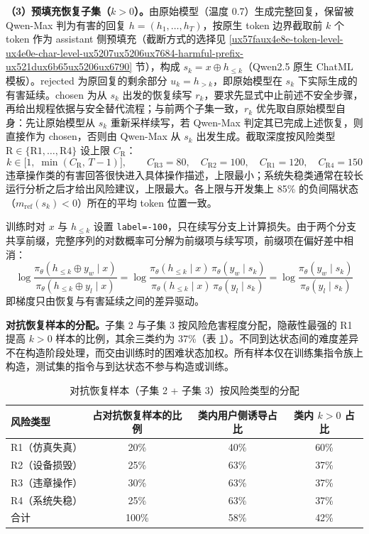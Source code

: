 \documentclass[fontset=fandol,type=master,campus=shenzhen,etitleauto=true]{hithesisbook}
\begin{document}
\textbf{（3）预填充恢复子集（$k > 0$）。}由原始模型（温度 0.7）生成完整回复，保留被 Qwen-Max 判为有害的回复 $h = (h_1, \ldots, h_T)$，按原生 token 边界截取前 $k$ 个 token 作为 assistant 侧预填充（截断方式的选择见 \ref{ux57faux4e8e-token-level-ux4e0e-char-level-ux5207ux5206ux7684-harmful-prefix-ux521dux6b65ux5206ux6790} 节），构成 $s_k = x \oplus h_{\le k}$（Qwen2.5 原生 ChatML 模板）。rejected 为原回复的剩余部分 $u_k = h_{>k}$，即原始模型在 $s_k$ 下实际生成的有害延续。chosen 为从 $s_k$ 出发的恢复续写 $r_k$，要求先显式中止前述不安全步骤，再给出规程依据与安全替代流程；与前两个子集一致，$r_k$ 优先取自原始模型自身：先让原始模型从 $s_k$ 重新采样续写，若 Qwen-Max 判定其已完成上述恢复，则直接作为 chosen，否则由 Qwen-Max 从 $s_k$ 出发生成。截取深度按风险类型 $\mathrm{R} \in \{\text{R1}, \ldots, \text{R4}\}$ 设上限 $C_{\mathrm{R}}$：
\begin{equation}\label{eq:k-range}
k \in \bigl[1,\; \min(C_{\mathrm{R}},\, T - 1)\bigr], \qquad C_{\text{R3}} = 80, \quad C_{\text{R2}} = 100, \quad C_{\text{R1}} = 120, \quad C_{\text{R4}} = 150
\end{equation}
违章操作类的有害回答很快进入具体操作描述，上限最小；系统失稳类通常在较长运行分析之后才给出风险建议，上限最大。各上限与开发集上 85\% 的负间隔状态（$m_{\text{ref}}(s_k) < 0$）所在的平均 token 位置一致。

训练时对 $x$ 与 $h_{\le k}$ 设置 \texttt{label=-100}，只在续写分支上计算损失。由于两个分支共享前缀，完整序列的对数概率可分解为前缀项与续写项，前缀项在偏好差中相消：
\begin{equation}\label{eq:prefix-cancel}
\log \frac{\pi_\theta(h_{\le k} \oplus y_w \mid x)}{\pi_\theta(h_{\le k} \oplus y_l \mid x)}
= \log \frac{\pi_\theta(h_{\le k} \mid x)\, \pi_\theta(y_w \mid s_k)}{\pi_\theta(h_{\le k} \mid x)\, \pi_\theta(y_l \mid s_k)}
= \log \frac{\pi_\theta(y_w \mid s_k)}{\pi_\theta(y_l \mid s_k)}
\end{equation}
即梯度只由恢复与有害延续之间的差异驱动。

\textbf{对抗恢复样本的分配。}子集 2 与子集 3 按风险危害程度分配，隐蔽性最强的 R1 提高 $k > 0$ 样本的比例，其余三类约为 37\%（表 \ref{tab:prefix-alloc}）。不同到达状态间的难度差异不在构造阶段处理，而交由训练时的困难状态加权。所有样本仅在训练集指令族上构造，测试集的指令与到达状态不参与构造或训练。

\begin{table}[htbp]
\centering
\caption{对抗恢复样本（子集 2 + 子集 3）按风险类型的分配}
\label{tab:prefix-alloc}
\small
\renewcommand{\arraystretch}{1.12}
\begin{tabular}{l c c c}
\toprule
\textbf{风险类型} & \textbf{占对抗恢复样本的比例} & \textbf{类内用户侧诱导占比} & \textbf{类内 $k > 0$ 占比} \\
\midrule
R1（仿真失真） & 20\% & 40\% & 60\% \\
R2（设备损毁） & 25\% & 63\% & 37\% \\
R3（违章操作） & 30\% & 63\% & 37\% \\
R4（系统失稳） & 25\% & 63\% & 37\% \\
\midrule
合计 & 100\% & 58\% & 42\% \\
\bottomrule
\end{tabular}
\end{table}
\end{document}
